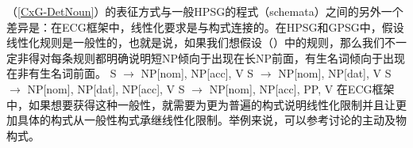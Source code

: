 （\ref{CxG-DetNoun}）的表征方式与一般HPSG的程式（schemata）之间的另外一个差异是：在ECG框架中，线性化要求是与构式连接的。在HPSG\indexhpsgc 和GPSG\indexgpsgc 中，假设线性化规则是一般性的，也就是说，如果我们想假设（）中的规则，那么我们不一定非得对每条规则都明确说明短NP倾向于出现在长NP前面，有生名词倾向于出现在非有生名词前面。
\eal
\ex S $\to$ NP[nom], NP[acc], V
\ex S $\to$ NP[nom], NP[dat], V
\ex S $\to$ NP[nom], NP[dat], NP[acc], V
\ex S $\to$ NP[nom], NP[acc], PP, V
\zl
在ECG框架中，如果想要获得这种一般性，就需要为更为普遍的构式说明线性化限制并且让更加具体的构式从一般性构式承继线性化限制。举例来说，可以参考\citet[]{BC2005a}讨论的主动及物构式。

